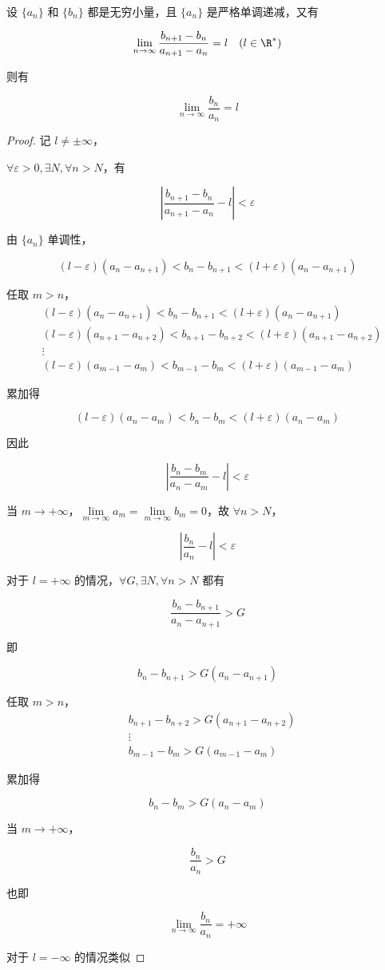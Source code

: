 \begin{theorem}
	设 $\{a_n\}$ 和 $\{b_n\}$ 都是无穷小量，且 $\{a_n\}$ 是严格单调递减，又有
	
	$$ \lim_{n \to \infty} \frac{b_{n+1} - b_n}{a_{n+1} - a_n} = l \quad (l \in\R^*) $$
	
	则有
	
	$$ \lim_{n \to \infty} \frac{b_n}{a_n} = l $$
\end{theorem}
\begin{proof}
	记 $l \neq\pm \infty$，
	
	$\forall \varepsilon > 0, \exists N, \forall n > N$，有
	
	$$ \left| \frac{b_{n+1} - b_n}{a_{n+1} - a_n} - l \right| < \varepsilon $$
	
	由 $\{a_n\}$ 单调性，
	
	$$ (l - \varepsilon)( a_n-a_{n+1} ) <  b_n-b_{n+1}  < (l + \varepsilon)( a_n- a_{n+1}) $$
	
	任取 $m > n$，
	$$\begin{aligned}
		&(l - \varepsilon)( a_n-a_{n+1} ) <  b_n-b_{n+1}  < (l + \varepsilon)( a_n- a_{n+1})\\
		&(l - \varepsilon)(a_{n+1} - a_{n+2}) < b_{n+1} - b_{n+2} < (l + \varepsilon)(a_{n+1} - a_{n+2})\\
		&\vdots\\
		&(l - \varepsilon)(a_{m-1} - a_{m}) < b_{m-1} - b_{m} < (l + \varepsilon)(a_{m-1} - a_{m})
	\end{aligned}$$
	
	
	累加得
	
	$$ (l - \varepsilon)(a_n - a_m) < b_n - b_m < (l + \varepsilon)(a_n - a_m) $$
	
	因此
	
	$$ \left| \frac{b_n - b_m}{a_n - a_m} - l \right| < \varepsilon $$
	
	当 $m \to +\infty$，$\lim\limits_{m \to \infty} a_m = \lim\limits_{m \to \infty} b_m = 0$，故 $\forall n> N$，
	
	$$ \left| \frac{b_n}{a_n} - l \right| < \varepsilon $$
	
	对于 $l = +\infty$ 的情况，$\forall G, \exists N, \forall n > N$ 都有
	
	$$ \frac{b_n - b_{n+1}}{a_n - a_{n+1}} > G $$
	
	即
	
	$$ b_n - b_{n+1} > G (a_n - a_{n+1}) $$
	
	任取 $m > n$，
	$$\begin{aligned}
		&b_{n+1} - b_{n+2} > G (a_{n+1} - a_{n+2})\\
		&\vdots\\
		&b_{m-1} - b_{m} > G (a_{m-1} - a_{m})
	\end{aligned}$$
	
	
	累加得
	
	$$ b_n - b_m > G (a_n - a_m) $$
	
	当 $m \to +\infty$，
	
	$$ \frac{b_n}{a_n} > G $$
	
	也即
	
	$$ \lim_{n \to \infty} \frac{b_n}{a_n} = +\infty $$
	
	对于 $l = -\infty$ 的情况类似
\end{proof}

